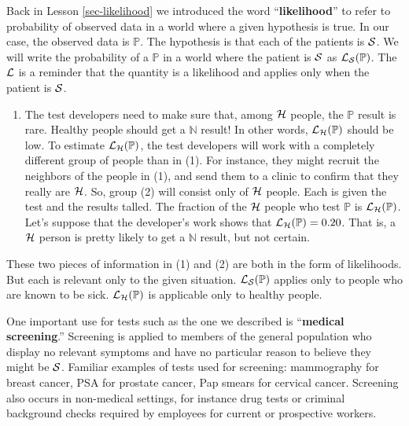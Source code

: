 \documentclass[
  letterpaper,
  DIV=11,
  numbers=noendperiod,
  oneside]{scrartcl}
\providecommand{\tightlist}{%
  \setlength{\itemsep}{0pt}\setlength{\parskip}{0pt}}\usepackage{longtable,booktabs,array}
\begin{document}
Back in Lesson \ref{sec-likelihood} we introduced the word
``\textbf{likelihood}'' to refer to probability of observed data in a
world where a given hypothesis is true. In our case, the observed data
is \({\mathbb{P}}\). The hypothesis is that each of the patients is
\({\cal S}\). We will write the probability of a \({\mathbb{P}}\) in a
world where the patient is \({\cal S}\) as
\({\cal L}_{{\cal S}} ({{\mathbb{P}}})\). The \(\cal L\) is a reminder
that the quantity is a likelihood and applies only when the patient is
\({\cal S}\).

\begin{enumerate}
\def\labelenumi{\arabic{enumi}.}
\setcounter{enumi}{1}
\tightlist
\item
  The test developers need to make sure that, among \({\cal H}\) people,
  the \({\mathbb{P}}\) result is rare. Healthy people should get a
  \({\mathbb{N}}\) result! In other words,
  \({\cal L}_{\cal H}({\mathbb{P}})\) should be low. To estimate
  \({\cal L}_{\cal H}({\mathbb{P}})\), the test developers will work
  with a completely different group of people than in (1). For instance,
  they might recruit the neighbors of the people in (1), and send them
  to a clinic to confirm that they really are \({\cal H}\). So, group
  (2) will consist only of \({\cal H}\) people. Each is given the test
  and the results talled. The fraction of the \({\cal H}\) people who
  test \({\mathbb{P}}\) is \({\cal L}_{\cal H}({\mathbb{P}})\). Let's
  suppose that the developer's work shows that
  \({\cal L}_{\cal H}({\mathbb{P}}) = 0.20\). That is, a \({\cal H}\)
  person is pretty likely to get a \({\mathbb{N}}\) result, but not
  certain.
\end{enumerate}

These two pieces of information in (1) and (2) are both in the form of
likelihoods. But each is relevant only to the given situation.
\({\cal L}_{\cal S}({\mathbb{P}})\) applies only to people who are known
to be sick. \({\cal L}_{\cal H}({\mathbb{P}})\) is applicable only to
healthy people.

One important use for tests such as the one we described is
``\textbf{medical screening}.'' Screening is applied to members of the
general population who display no relevant symptoms and have no
particular reason to believe they might be \({\cal S}\). Familiar
examples of tests used for screening: mammography for breast cancer, PSA
for prostate cancer, Pap smears for cervical cancer. Screening also
occurs in non-medical settings, for instance drug tests or criminal
background checks required by employees for current or prospective
workers.
\end{document}

